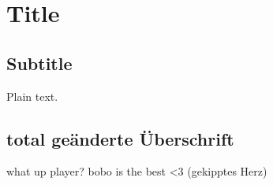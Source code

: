 \documentclass{article}
\begin{document}
\section{Title}

\subsection{Subtitle}

Plain text.

\subsection{total geänderte Überschrift}

what up player?
bobo is the best <3 (gekipptes Herz)
\end{document}
